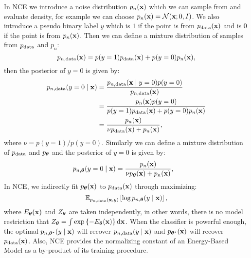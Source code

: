 \documentclass{article}
\begin{document}
In NCE we introduce a noise distribution $p_n({\mathbf{x}})$ which we can sample from and evaluate density, for example we can choose $p_n({\mathbf{x}}) = \mathcal{N}({\mathbf{x}}; 0, I)$. We also introduce a pseudo binary label $y$ which is $1$ if the point is from $p_{\rm{data}}({\mathbf{x}})$ and is $0$ if the point is from $p_n({\mathbf{x}})$. Then we can define a mixture distribution of samples from $p_{\rm{data}}$ and $p_n$:
$$
p_{n, \mathrm{data}}({\mathbf{x}}) = p(y = 1)p_{\rm{data}}({\mathbf{x}}) + p(y = 0)p_n({\mathbf{x}}),
$$
then the posterior of $y = 0$ is given by:
\begin{equation}
    \begin{aligned}
        p_{n, \mathrm{data}}(y = 0 \mid {\mathbf{x}})
        &= \frac{p_{n, \mathrm{data}}({\mathbf{x}} \mid y = 0)p(y = 0)}{p_{n, \mathrm{data}}({\mathbf{x}})} \\
        &= \frac{p_{n}({\mathbf{x}})p(y = 0)}{p(y = 1)p_{\rm{data}}({\mathbf{x}}) + p(y = 0)p_n({\mathbf{x}})} \\
        &= \frac{p_{n}({\mathbf{x}})}{\nu p_{\rm{data}}({\mathbf{x}}) + p_n({\mathbf{x}})},
    \end{aligned}
\end{equation}
where $\nu = p(y = 1) / p(y = 0)$. Similarly we can define a mixture distribution of $p_{\rm{data}}$ and $p_{\bm{\theta}}$ and the posterior of $y = 0$ is given by:
\begin{equation}
    \begin{aligned}
        p_{n, {\bm{\theta}}}(y = 0 \mid {\mathbf{x}})
        &= \frac{p_{n}({\mathbf{x}})}{\nu p_{\bm{\theta}}({\mathbf{x}}) + p_n({\mathbf{x}})},
    \end{aligned}
\end{equation}
In NCE, we indirectly fit $p_{{\bm{\theta}}}({\mathbf{x}})$ to $p_{\mathrm{data}}({\mathbf{x}})$ through maximizing:
\begin{equation}
    \mathbb{E}_{p_{n, \textrm{data}}({\mathbf{x}}, y)}\left[ \log p_{n, {\bm{\theta}}}(y \mid {\mathbf{x}}) \right],
\end{equation}
where $E_{\bm{\theta}}({\mathbf{x}})$ and $Z_{\bm{\theta}}$ are taken independently, in other words, there is no model restriction that $Z_{\bm{\theta}} = \int \exp\left\{-E_{\bm{\theta}}({\mathbf{x}})\right\} \mathrm{d} {\mathbf{x}}$. When the classifier is powerful enough, the optimal $p_{n, {\bm{\theta}}^*}(y \mid {\mathbf{x}})$ will recover $p_{n, \mathrm{data}}(y \mid {\mathbf{x}})$ and $p_{{\bm{\theta}}^*}({\mathbf{x}})$ will recover $p_{\rm{data}}({\mathbf{x}})$. Also, NCE provides the normalizing constant of an Energy-Based Model as a by-product of its training procedure.
\end{document}
